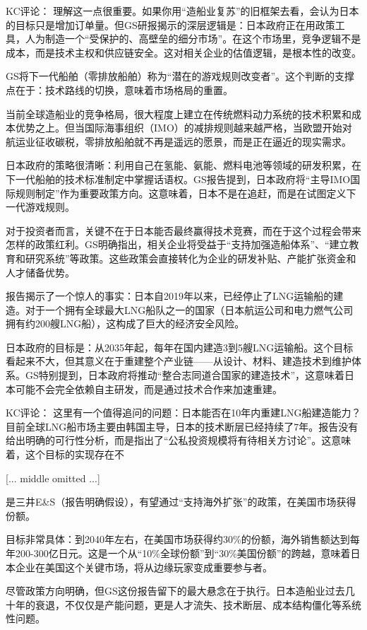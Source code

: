 \documentclass[11pt]{ctexart}
\begin{document}
KC评论： 理解这一点很重要。如果你用“造船业复苏”的旧框架去看，会认为日本的目标只是增加订单量。但GS研报揭示的深层逻辑是：日本政府正在用政策工具，人为制造一个“受保护的、高壁垒的细分市场”。在这个市场里，竞争逻辑不是成本，而是技术主权和供应链安全。这对相关企业的估值逻辑，是根本性的改变。

GS将下一代船舶（零排放船舶）称为“潜在的游戏规则改变者”。这个判断的支撑点在于：技术路线的切换，意味着市场格局的重置。

当前全球造船业的竞争格局，很大程度上建立在传统燃料动力系统的技术积累和成本优势之上。但当国际海事组织（IMO）的减排规则越来越严格，当欧盟开始对航运业征收碳税，零排放船舶就不再是遥远的愿景，而是正在逼近的现实需求。

日本政府的策略很清晰：利用自己在氢能、氨能、燃料电池等领域的研发积累，在下一代船舶的技术标准制定中掌握话语权。GS报告提到，日本政府将“主导IMO国际规则制定”作为重要政策方向。这意味着，日本不是在追赶，而是在试图定义下一代游戏规则。

对于投资者而言，关键不在于日本能否最终赢得技术竞赛，而在于这个过程会带来怎样的政策红利。GS明确指出，相关企业将受益于“支持加强造船体系”、“建立教育和研究系统”等政策。这些政策会直接转化为企业的研发补贴、产能扩张资金和人才储备优势。

报告揭示了一个惊人的事实：日本自2019年以来，已经停止了LNG运输船的建造。对于一个拥有全球最大LNG船队之一的国家（日本航运公司和电力燃气公司拥有约200艘LNG船），这构成了巨大的经济安全风险。

日本政府的目标是：从2035年起，每年在国内建造3到5艘LNG运输船。这个目标看起来不大，但其意义在于重建整个产业链——从设计、材料、建造技术到维护体系。GS特别提到，日本政府将推动“整合志同道合国家的建造技术”，这意味着日本可能不会完全依赖自主研发，而是通过技术合作来加速重建。

KC评论： 这里有一个值得追问的问题：日本能否在10年内重建LNG船建造能力？目前全球LNG船市场主要由韩国主导，日本的技术断层已经持续了7年。报告没有给出明确的可行性分析，而是指出了“公私投资规模将有待相关方讨论”。这意味着，这个目标的实现存在不

[... middle omitted ...]

是三井E\&S（报告明确假设），有望通过“支持海外扩张”的政策，在美国市场获得份额。

目标非常具体：到2040年左右，在美国市场获得约30\%的份额，海外销售额达到每年200-300亿日元。这是一个从“10\%全球份额”到“30\%美国份额”的跨越，意味着日本企业在美国这个关键市场，将从边缘玩家变成重要参与者。

尽管政策方向明确，但GS这份报告留下的最大悬念在于执行。日本造船业过去几十年的衰退，不仅仅是产能问题，更是人才流失、技术断层、成本结构僵化等系统性问题。
\end{document}

